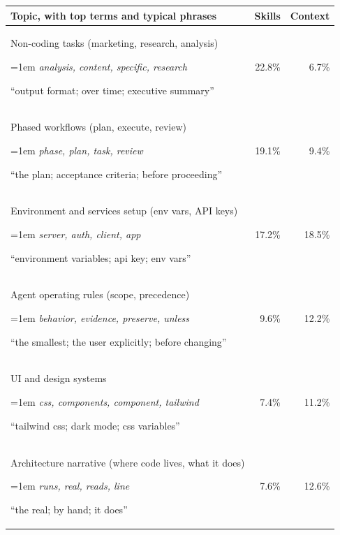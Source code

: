 \begin{tabular}{@{}p{}rr@{}}
\toprule
Topic, with top terms and typical phrases & Skills & Context \\
\midrule
Non-coding tasks (marketing, research, analysis)\par{\scriptsize\color{black!65}\raggedright\leftskip=1em\parskip=0pt \textit{analysis, content, specific, research}\par``output format; over time; executive summary''\par}\vspace{-\baselineskip} & 22.8\% & 6.7\% \\[-6pt]
Phased workflows (plan, execute, review)\par{\scriptsize\color{black!65}\raggedright\leftskip=1em\parskip=0pt \textit{phase, plan, task, review}\par``the plan; acceptance criteria; before proceeding''\par}\vspace{-\baselineskip} & 19.1\% & 9.4\% \\[-6pt]
Environment and services setup (env vars, API keys)\par{\scriptsize\color{black!65}\raggedright\leftskip=1em\parskip=0pt \textit{server, auth, client, app}\par``environment variables; api key; env vars''\par}\vspace{-\baselineskip} & 17.2\% & 18.5\% \\[-6pt]
Agent operating rules (scope, precedence)\par{\scriptsize\color{black!65}\raggedright\leftskip=1em\parskip=0pt \textit{behavior, evidence, preserve, unless}\par``the smallest; the user explicitly; before changing''\par}\vspace{-\baselineskip} & 9.6\% & 12.2\% \\[-6pt]
UI and design systems\par{\scriptsize\color{black!65}\raggedright\leftskip=1em\parskip=0pt \textit{css, components, component, tailwind}\par``tailwind css; dark mode; css variables''\par}\vspace{-\baselineskip} & 7.4\% & 11.2\% \\[-6pt]
Architecture narrative (where code lives, what it does)\par{\scriptsize\color{black!65}\raggedright\leftskip=1em\parskip=0pt \textit{runs, real, reads, line}\par``the real; by hand; it does''\par}\vspace{-\baselineskip} & 7.6\% & 12.6\% \\[-6pt]

\end{tabular}

